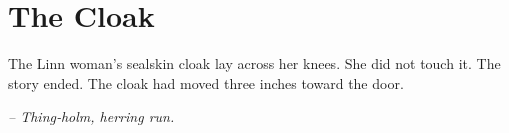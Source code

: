 \chapter*{The Cloak}

The Linn woman's sealskin cloak lay across her knees. She did not touch it. The story ended. The cloak had moved three inches toward the door.

\smallskip

\noindent \textit{-- Thing‑holm, herring run.}

